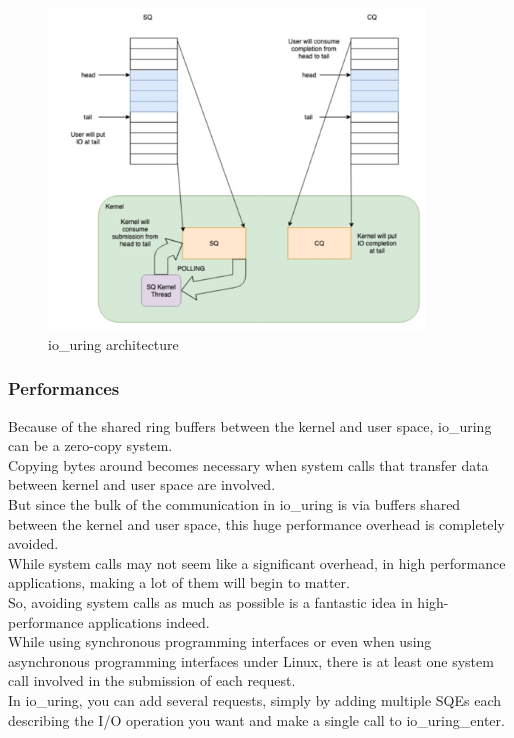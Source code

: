 \begin{figure}[H]
    \centering
    \includegraphics[width=10cm]{images/io_uring.jpg}
    \caption{io\_uring architecture}
    \label{fig:io\_uring architecture}
\end{figure}

\subsubsection{Performances}

Because of the shared ring buffers between the kernel and user space, io\_uring can be a zero-copy system.\\ Copying bytes around becomes necessary when system calls that transfer data between kernel and user space are involved.\\
But since the bulk of the communication in io\_uring is via buffers shared between the kernel and user space, this huge performance overhead is completely avoided.\\ 
While system calls may not seem like a significant overhead, in high performance applications, making a lot of them will begin to matter. \\
So, avoiding system calls as much as possible is a fantastic idea in high-performance applications indeed. \\
While using synchronous programming interfaces or even when using asynchronous programming interfaces under Linux, there is at least one system call involved in the submission of each request.\\
In io\_uring, you can add several requests, simply by adding multiple SQEs each describing the I/O operation you want and make a single call to io\_uring\_enter.


